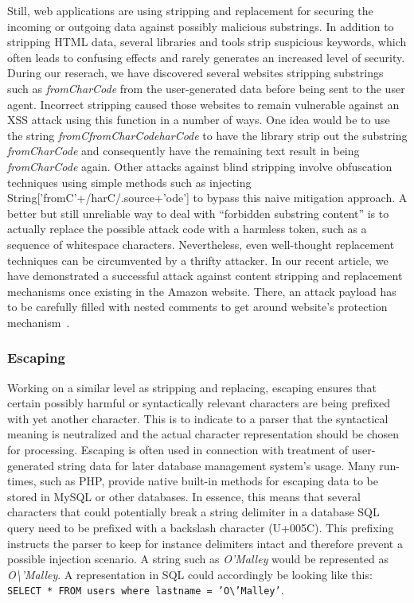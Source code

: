     Still, web applications are using stripping and replacement for securing the incoming or outgoing data against possibly malicious substrings. In addition to stripping HTML data, several libraries and tools strip suspicious keywords, which often leads to confusing effects and rarely generates an increased level of security. During our reserach, we have discovered several websites stripping substrings such as \textit{fromCharCode} from the user-generated data before being sent to the user agent. Incorrect stripping caused those websites to remain vulnerable against an XSS attack using this function in a number of ways. One idea would be to use the string \textit{fromCfromCharCodeharCode} to have the library strip out the substring \textit{fromCharCode} and consequently have the remaining text result in being \textit{fromCharCode} again. Other attacks against blind stripping involve obfuscation techniques using simple methods such as injecting String['fromC'+/harC/.source+'ode'] to bypass this naive 
mitigation approach. A better but still unreliable way to deal with ``forbidden substring content'' is to actually replace the possible attack code with a harmless token, such as a sequence of whitespace characters. Nevertheless, even well-thought replacement techniques can be circumvented by a thrifty attacker. In our recent article, we have demonstrated a successful attack against content stripping and replacement mechanisms once existing in the Amazon website. There, an attack payload has to be carefully filled with nested comments to get around website's protection mechanism~\cite{somorovsky2011all}.

    \subsubsection{Escaping}
    \label{subsubsec:4.3.3.escaping}

    Working on a similar level as stripping and replacing, escaping ensures that certain possibly harmful or syntactically relevant characters are being prefixed with yet another character. This is to indicate to a parser that the syntactical meaning is neutralized and the actual character representation should be chosen for processing. Escaping is often used in connection with treatment of user-generated string data for later database management system's usage. Many run-times, such as PHP, provide native built-in methods for escaping data to be stored in MySQL or other databases. In essence, this means that several characters that could potentially break a string delimiter in a database SQL query need to be prefixed with a backslash character (U+005C). This prefixing instructs the parser to keep for instance delimiters intact and therefore prevent a possible injection scenario. A string such as \textit{O'Malley} would be represented as \textit{O\textbackslash'Malley}. A representation in SQL could 
accordingly be looking like this: \texttt{SELECT * FROM users where lastname = 'O\textbackslash'Malley'}.\\

